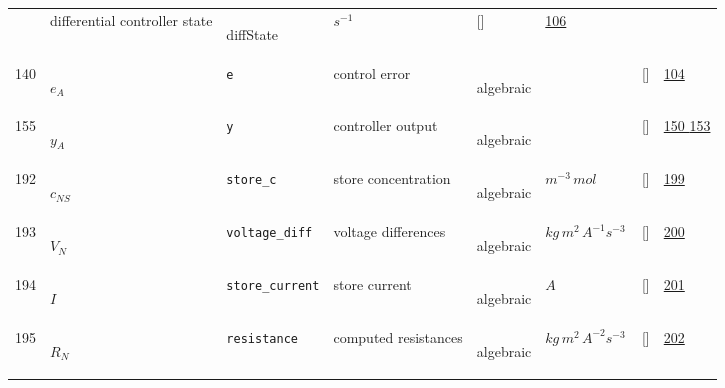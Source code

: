 \begin{longtable}{|p{1cm}|p{3cm}|p{3cm}|p{7cm}|p{3.0cm}|p{3cm}|p{2cm}|p{1cm}|}
             & differential controller state
             & \begin{lay}diffState \end{lay}
             & $ s^{-1} \, $
             & []
             & \hyperlink{"e:106"}{ 106 }
                 \\
    140
             & \hypertarget{"v:140"}{ $ {e}{_{A}} $}
             & \verb|e|
             & control error
             & \begin{lay}algebraic \end{lay}
             & $  $
             & []
             & \hyperlink{"e:104"}{ 104 }
                 \\
    155
             & \hypertarget{"v:155"}{ $ {y}{_{A}} $}
             & \verb|y|
             & controller output
             & \begin{lay}algebraic \end{lay}
             & $  $
             & []
             & \hyperlink{"e:150"}{ 150 }
                 \hyperlink{"e:153"}{ 153 }
                 \\
    192
             & \hypertarget{"v:192"}{ $ {c}{_{{N S}}} $}
             & \verb|store_c|
             & store concentration
             & \begin{lay}algebraic \end{lay}
             & $ m^{-3} \,mol \, $
             & []
             & \hyperlink{"e:199"}{ 199 }
                 \\
    193
             & \hypertarget{"v:193"}{ $ {V}{_{N}} $}
             & \verb|voltage_diff|
             & voltage differences
             & \begin{lay}algebraic \end{lay}
             & $ kg \,m^{2} \,A^{-1} s^{-3} \, $
             & []
             & \hyperlink{"e:200"}{ 200 }
                 \\
    194
             & \hypertarget{"v:194"}{ $ {I}{_{}} $}
             & \verb|store_current|
             & store current
             & \begin{lay}algebraic \end{lay}
             & $ A \, $
             & []
             & \hyperlink{"e:201"}{ 201 }
                 \\
    195
             & \hypertarget{"v:195"}{ $ {R}{_{N}} $}
             & \verb|resistance|
             & computed resistances
             & \begin{lay}algebraic \end{lay}
             & $ kg \,m^{2} \,A^{-2} s^{-3} \, $
             & []
             & \hyperlink{"e:202"}{ 202 }
                 \\
    \end{longtable}